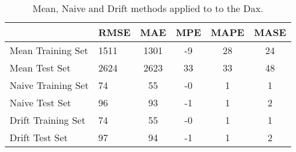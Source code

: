 \begin{table}[ht]
\centering
\caption[Simple forecasting methods.]{Mean, Naive and Drift methods applied to 
         to the Dax.} 
\label{tab:chp_ts:sma}
\begin{tabular}{llcccc}
  \toprule  & RMSE & MAE & MPE & MAPE & MASE \\ 
  \midrule Mean Training Set & 1511 & 1301 & -9 & 28 & 24 \\ 
  Mean Test Set & 2624 & 2623 & 33 & 33 & 48 \\ 
  Naive Training Set & 74 & 55 & -0 & 1 & 1 \\ 
  Naive Test Set & 96 & 93 & -1 & 1 & 2 \\ 
  Drift Training Set & 74 & 55 & -0 & 1 & 1 \\ 
  Drift Test Set & 97 & 94 & -1 & 1 & 2 \\ 
   \bottomrule \end{tabular}
\end{table}
